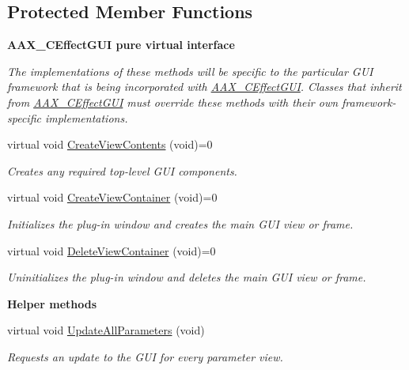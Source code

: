 \subsection*{Protected Member Functions}
\begin{Indent}\textbf{ A\+A\+X\+\_\+\+C\+Effect\+G\+UI pure virtual interface}\par
{\em The implementations of these methods will be specific to the particular G\+UI framework that is being incorporated with \mbox{\hyperlink{a01477}{A\+A\+X\+\_\+\+C\+Effect\+G\+UI}}. Classes that inherit from \mbox{\hyperlink{a01477}{A\+A\+X\+\_\+\+C\+Effect\+G\+UI}} must override these methods with their own framework-\/specific implementations. }\begin{DoxyCompactItemize}
\item 
virtual void \mbox{\hyperlink{a01477_ab84514feda09e4893ee0ff5e6df99b23}{Create\+View\+Contents}} (void)=0
\begin{DoxyCompactList}\small\item\em Creates any required top-\/level G\+UI components. \end{DoxyCompactList}\item 
virtual void \mbox{\hyperlink{a01477_adbc45d3155099452ca746ee3940f16da}{Create\+View\+Container}} (void)=0
\begin{DoxyCompactList}\small\item\em Initializes the plug-\/in window and creates the main G\+UI view or frame. \end{DoxyCompactList}\item 
virtual void \mbox{\hyperlink{a01477_a56632ebf59c5ef3f4fe3d7d76da27a37}{Delete\+View\+Container}} (void)=0
\begin{DoxyCompactList}\small\item\em Uninitializes the plug-\/in window and deletes the main G\+UI view or frame. \end{DoxyCompactList}\end{DoxyCompactItemize}
\end{Indent}
\begin{Indent}\textbf{ Helper methods}\par
\begin{DoxyCompactItemize}
\item 
virtual void \mbox{\hyperlink{a01477_a172074a301ac9c771443b4b63a5b426b}{Update\+All\+Parameters}} (void)
\begin{DoxyCompactList}\small\item\em Requests an update to the G\+UI for every parameter view. \end{DoxyCompactList}\end{DoxyCompactItemize}
\end{Indent}
